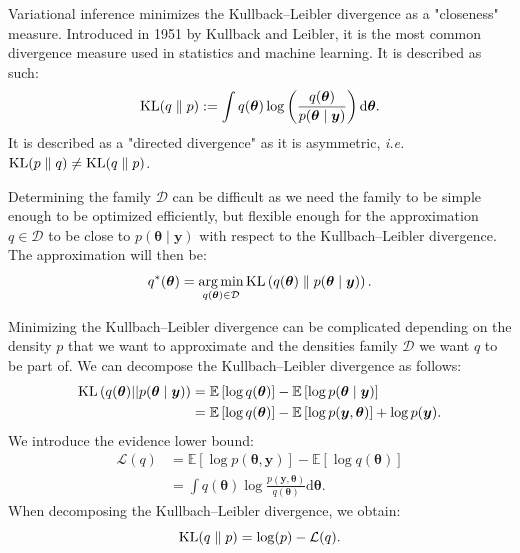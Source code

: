 \documentclass{article}
\numberwithin{equation}{section}
\DeclareMathOperator*{\argmin}{arg\,min}
\DeclareMathOperator*{\KL}{{\rm KL}}
\begin{document}
Variational inference minimizes the Kullback--Leibler divergence as a "closeness" measure. Introduced in 1951 by Kullback and Leibler\cite{kl51}, it is the most common divergence measure used in statistics and machine learning. It is described as such:
\begin{equation*}
\KL(q\parallel p) := \int q(\boldsymbol{\theta})\log \left(\frac{q(\boldsymbol{\theta})}{p(\boldsymbol{\theta} \mid \boldsymbol{y})}\right) \mathrm{d}\boldsymbol{\theta}.
\end{equation*} 
It is described as a "directed divergence" as it is asymmetric, \textit{i.e.} $\KL(p\parallel q) \neq \KL(q \parallel p)$.

Determining the family $\mathcal{D}$ can be difficult as we need the family to be simple enough to be optimized efficiently, but flexible enough for the approximation $q \in \mathcal{D}$ to be close to $p(\boldsymbol{\theta} \mid \boldsymbol{y})$ with respect to the Kullbach--Leibler divergence. The approximation will then be:
\begin{equation*}
q^*(\boldsymbol{\theta} ) = \argmin_{q(\boldsymbol{\theta}) \in \mathcal{D}} \KL\left( q(\boldsymbol{\theta}) \parallel p(\boldsymbol{\theta} \mid \boldsymbol{y})\right).
\end{equation*}

Minimizing the Kullbach--Leibler divergence can be complicated depending on the density $p$ that we want to approximate and the densities family $\mathcal{D}$ we want $q$ to be part of. We can decompose the Kullbach--Leibler divergence as follows:
\begin{align*}
\KL\left(q(\boldsymbol{\theta})||p(\boldsymbol{\theta}\mid \boldsymbol{y})\right) &= \mathbb{E}\left[\log q(\boldsymbol{\theta})\right] - \mathbb{E}\left[\log p(\boldsymbol{\theta}\mid \boldsymbol{y})\right]\\
&= \mathbb{E}\left[\log q(\boldsymbol{\theta})\right] - \mathbb{E}\left[\log p(\boldsymbol{y},\boldsymbol{\theta})\right] + \log p(\boldsymbol{y}).
\end{align*}
We introduce the evidence lower bound:
\begin{align*}
\mathcal{L}(q) &= \mathbb{E}\left[\log p(\boldsymbol{\theta},\boldsymbol{y})\right] - \mathbb{E}\left[\log q(\boldsymbol{\theta})\right]\\
&=\int q(\boldsymbol{\theta})\log\frac{p(\boldsymbol{y},\boldsymbol{\theta})}{q(\boldsymbol{\theta})}\mathrm{d}\boldsymbol{\theta}.
\end{align*}
When decomposing the Kullbach--Leibler divergence, we obtain:
\begin{equation*}
\KL(q\parallel p) = \log(p) - \mathcal{L}(q).
\end{equation*}
\end{document}
